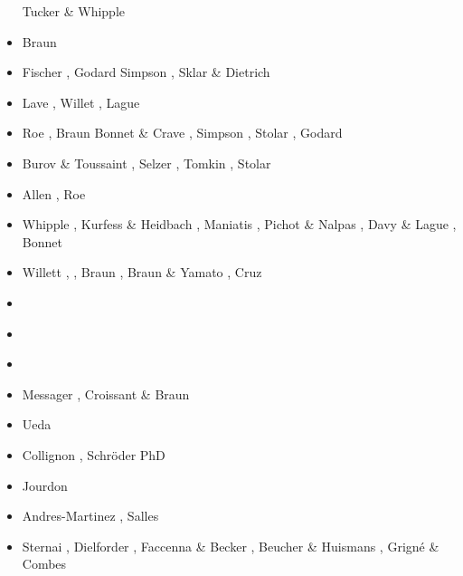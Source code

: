 \begin{scriptsize}
\begin{itemize}
                        Tucker \& Whipple \cite{tuwh02}
\item [\twothousandthree] Braun \cite{brau03}
\item [\twothousandfour] Fischer \etal \cite{fijj04}, Godard \etal \cite{gocl04}
                         Simpson \cite{simp04}, Sklar \& Dietrich \cite{skdi04}
\item [\twothousandfive] Lave \cite{lave05}, Willet \cite{will05}, Lague \etal \cite{lahd05}
\item [\twothousandsix] Roe \etal \cite{rosw06}, Braun \cite{brau06}
                        Bonnet \& Crave \cite{bocr06}, Simpson \cite{simp06},
                        Stolar \etal \cite{stwr06}, Godard \etal \cite{golc06}
\item [\twothousandseven] Burov \& Toussaint \cite{buto07}, Selzer \etal \cite{sebp07},
                          Tomkin \cite{tomk07}, Stolar \etal \cite{strw07}
\item [\twothousandeight] Allen \cite{alle08}, Roe \etal \cite{rowf08}
\item [\twothousandnine]  Whipple \cite{whip09}, Kurfess \& Heidbach \cite{kuhe09},
                          Maniatis \etal \cite{makh09}, Pichot \& Nalpas \cite{pina09},
                          Davy \& Lague \cite{dala09}, Bonnet \cite{bonn09}
\item [\twothousandten] Willett \cite{will10}, \cite{tuha10},
                        Braun \cite{brau10}, Braun \& Yamato \cite{brya10},
                        Cruz \etal \cite{crmw10}
\item [\twothousandeleven] \cite{robr11}\cite{grhd11}
\item [\twothousandtwelve]  \cite{kiwh12}\cite{brvv12}
\item [\twothousandthirteen] \cite{vehc13}\cite{brwi13}\cite{fihv13a}\cite{fihv13b}
                      \cite{brrs13}\cite{chgz13}\cite{tuva13}\cite{caya13} 
\item [\twothousandfourteen] Messager \etal \cite{mehn14}, Croissant \& Braun \cite{crbr14}
                      \cite{cokm14}\cite{erhv14}\cite{erhv15}\cite{stsc14}\cite{olbm14} 
\item [\twothousandfifteen]  Ueda \etal \cite{uewg15,fohk15,cofk15}
\item [\twothousandsixteen]  Collignon \etal \cite{coyc16}, Schr{\"o}der PhD \cite{schr16}
\item [\twothousandeighteen] Jourdon \etal \cite{jolp18}
\item [\twothousandnineteen] Andres-Martinez \etal \cite{anpa19}, Salles \cite{sall19}
\item [\twothousandtwenty]  Sternai \cite{ster20}, Dielforder \etal \cite{diho20}, 
                            Faccenna \& Becker \cite{fabe20}, Beucher \& Huismans \cite{behu20}, 
                            Grign\'e \& Combes \cite{grco20}
\end{itemize}
\end{scriptsize}

